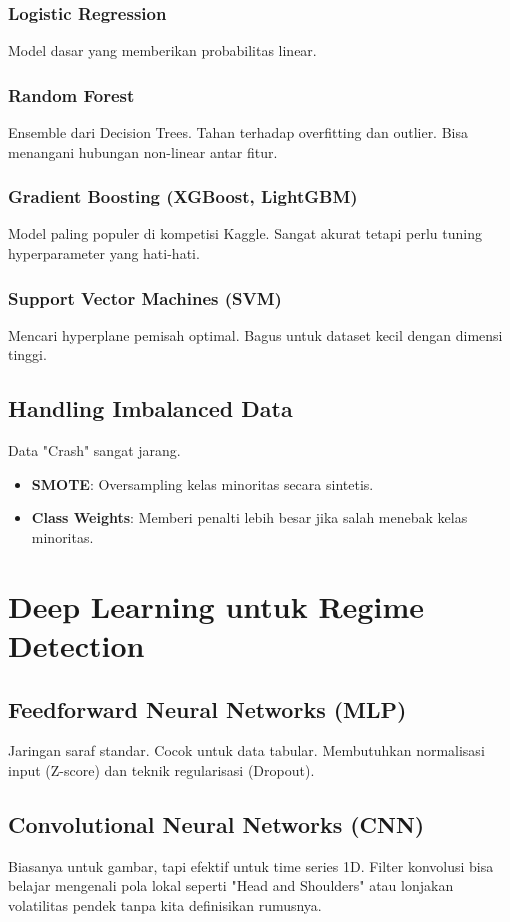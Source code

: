 \documentclass[12pt,a4paper]{book}
\begin{document}
\subsection{Logistic Regression}
Model dasar yang memberikan probabilitas linear.

\subsection{Random Forest}
Ensemble dari Decision Trees. Tahan terhadap overfitting dan outlier. Bisa menangani hubungan non-linear antar fitur.

\subsection{Gradient Boosting (XGBoost, LightGBM)}
Model paling populer di kompetisi Kaggle. Sangat akurat tetapi perlu tuning hyperparameter yang hati-hati.

\subsection{Support Vector Machines (SVM)}
Mencari hyperplane pemisah optimal. Bagus untuk dataset kecil dengan dimensi tinggi.

\section{Handling Imbalanced Data}
Data "Crash" sangat jarang.
\begin{itemize}
    \item \textbf{SMOTE}: Oversampling kelas minoritas secara sintetis.
    \item \textbf{Class Weights}: Memberi penalti lebih besar jika salah menebak kelas minoritas.
\end{itemize}

\chapter{Deep Learning untuk Regime Detection}
\section{Feedforward Neural Networks (MLP)}
Jaringan saraf standar. Cocok untuk data tabular. Membutuhkan normalisasi input (Z-score) dan teknik regularisasi (Dropout).

\section{Convolutional Neural Networks (CNN)}
Biasanya untuk gambar, tapi efektif untuk time series 1D. Filter konvolusi bisa belajar mengenali pola lokal seperti "Head and Shoulders" atau lonjakan volatilitas pendek tanpa kita definisikan rumusnya.
\end{document}
